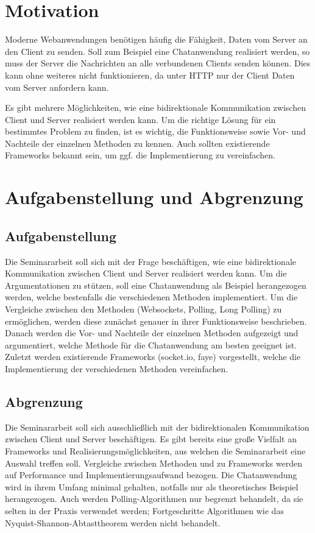 \documentclass[sigplan,screen]{acmart}
\begin{document}
\section{Motivation}

Moderne Webanwendungen benötigen häufig die Fähigkeit, Daten vom Server an den Client zu senden.
Soll zum Beispiel eine Chatanwendung realisiert werden, so muss der Server die Nachrichten an alle verbundenen Clients senden können.
Dies kann ohne weiteres nicht funktionieren, da unter HTTP nur der Client Daten vom Server anfordern kann.

Es gibt mehrere Möglichkeiten, wie eine bidirektionale Kommunikation zwischen Client und Server realisiert werden kann.
Um die richtige Lösung für ein bestimmtes Problem zu finden, ist es wichtig, die Funktionsweise sowie Vor- und Nachteile der einzelnen Methoden zu kennen.
Auch sollten existierende Frameworks bekannt sein, um ggf. die Implementierung zu vereinfachen.


\section{Aufgabenstellung und Abgrenzung}

\subsection{Aufgabenstellung}

Die Seminararbeit soll sich mit der Frage beschäftigen, wie eine bidirektionale Kommunikation zwischen Client und Server realisiert werden kann.
Um die Argumentationen zu stützen, soll eine Chatanwendung als Beispiel herangezogen werden, welche bestenfalls die verschiedenen Methoden implementiert.
Um die Vergleiche zwischen den Methoden (Websockets, Polling, Long Polling) zu ermöglichen, werden diese zunächst genauer in ihrer Funktionsweise beschrieben.
Danach werden die Vor- und Nachteile der einzelnen Methoden aufgezeigt und argumentiert, welche Methode für die Chatanwendung am besten geeignet ist.
Zuletzt werden existierende Frameworks (socket.io, faye) vorgestellt, welche die Implementierung der verschiedenen Methoden vereinfachen.

\subsection{Abgrenzung}

Die Seminararbeit soll sich ausschließlich mit der bidirektionalen Kommunikation zwischen Client und Server beschäftigen.
Es gibt bereits eine große Vielfalt an Frameworks und Realisierungsmöglichkeiten, aus welchen die Seminararbeit eine Auswahl treffen soll.
Vergleiche zwischen Methoden und zu Frameworks werden auf Performance und Implementierungsaufwand bezogen.
Die Chatanwendung wird in ihrem Umfang minimal gehalten, notfalls nur als theoretisches Beispiel herangezogen.
Auch werden Polling-Algorithmen nur begrenzt behandelt, da sie selten in der Praxis verwendet werden;
Fortgeschritte Algorithmen wie das Nyquist-Shannon-Abtasttheorem werden nicht behandelt.
\end{document}
